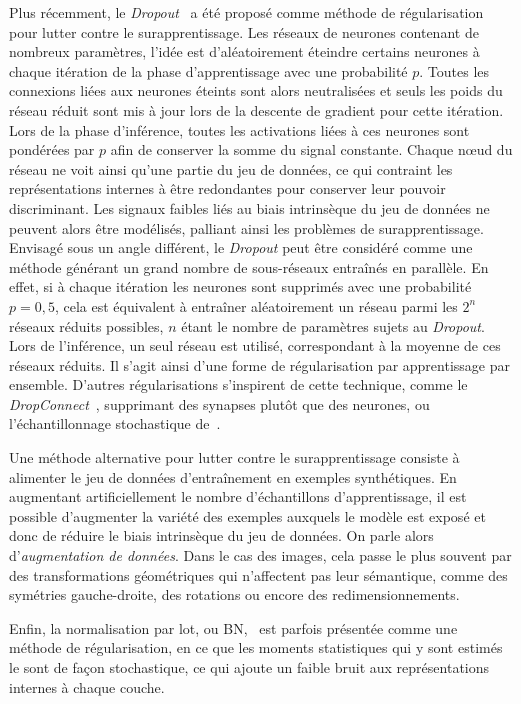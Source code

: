 Plus récemment, le \emph{Dropout}~\cite{srivastava_dropout_2014} a été proposé comme méthode de régularisation pour lutter contre le surapprentissage. Les réseaux de neurones contenant de nombreux paramètres, l'idée est d'aléatoirement éteindre certains neurones à chaque itération de la phase d'apprentissage avec une probabilité $p$. Toutes les connexions liées aux neurones éteints sont alors neutralisées et seuls les poids du réseau réduit sont mis à jour lors de la descente de gradient pour cette itération. Lors de la phase d'inférence, toutes les activations liées à ces neurones sont pondérées par $p$ afin de conserver la somme du signal constante. Chaque n\oe{}ud du réseau ne voit ainsi qu'une partie du jeu de données, ce qui contraint les représentations internes à être redondantes pour conserver leur pouvoir discriminant. Les signaux faibles liés au biais intrinsèque du jeu de données ne peuvent alors être modélisés, palliant ainsi les problèmes de surapprentissage. Envisagé sous un angle différent, le \emph{Dropout} peut être considéré comme une méthode générant un grand nombre de sous-réseaux entraînés en parallèle. En effet, si à chaque itération les neurones sont supprimés avec une probabilité $p = 0,5$, cela est équivalent à entraîner aléatoirement un réseau parmi les $2^n$ réseaux réduits possibles, $n$ étant le nombre de paramètres sujets au \emph{Dropout}. Lors de l'inférence, un seul réseau est utilisé, correspondant à la moyenne de ces réseaux réduits. Il s'agit ainsi d'une forme de régularisation par apprentissage par ensemble. D'autres régularisations s'inspirent de cette technique, comme le \emph{DropConnect}~\cite{wan_regularization_2013}, supprimant des synapses plutôt que des neurones, ou l'échantillonnage stochastique de~\citet{zeiler_stochastic_2013}.

Une méthode alternative pour lutter contre le surapprentissage consiste à alimenter le jeu de données d'entraînement en exemples synthétiques. En augmentant artificiellement le nombre d'échantillons d'apprentissage, il est possible d'augmenter la variété des exemples auxquels le modèle est exposé et donc de réduire le biais intrinsèque du jeu de données. On parle alors d'\emph{augmentation de données}. Dans le cas des images, cela passe le plus souvent par des transformations géométriques qui n'affectent pas leur sémantique, comme des symétries gauche-droite, des rotations ou encore des redimensionnements.

Enfin, la normalisation par lot, ou \gls{BN},~\cite{ioffe_batch_2015} est parfois présentée comme une méthode de régularisation, en ce que les moments statistiques qui y sont estimés le sont de façon stochastique, ce qui ajoute un faible bruit aux représentations internes à chaque couche.

